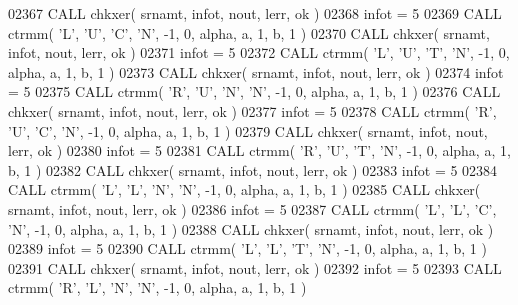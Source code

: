 \begin{DoxyCode}
02367       \textcolor{keyword}{CALL }chkxer( srnamt, infot, nout, lerr, ok )
02368       infot = 5
02369       \textcolor{keyword}{CALL }ctrmm( \textcolor{stringliteral}{'L'}, \textcolor{stringliteral}{'U'}, \textcolor{stringliteral}{'C'}, \textcolor{stringliteral}{'N'}, -1, 0, alpha, a, 1, b, 1 )
02370       \textcolor{keyword}{CALL }chkxer( srnamt, infot, nout, lerr, ok )
02371       infot = 5
02372       \textcolor{keyword}{CALL }ctrmm( \textcolor{stringliteral}{'L'}, \textcolor{stringliteral}{'U'}, \textcolor{stringliteral}{'T'}, \textcolor{stringliteral}{'N'}, -1, 0, alpha, a, 1, b, 1 )
02373       \textcolor{keyword}{CALL }chkxer( srnamt, infot, nout, lerr, ok )
02374       infot = 5
02375       \textcolor{keyword}{CALL }ctrmm( \textcolor{stringliteral}{'R'}, \textcolor{stringliteral}{'U'}, \textcolor{stringliteral}{'N'}, \textcolor{stringliteral}{'N'}, -1, 0, alpha, a, 1, b, 1 )
02376       \textcolor{keyword}{CALL }chkxer( srnamt, infot, nout, lerr, ok )
02377       infot = 5
02378       \textcolor{keyword}{CALL }ctrmm( \textcolor{stringliteral}{'R'}, \textcolor{stringliteral}{'U'}, \textcolor{stringliteral}{'C'}, \textcolor{stringliteral}{'N'}, -1, 0, alpha, a, 1, b, 1 )
02379       \textcolor{keyword}{CALL }chkxer( srnamt, infot, nout, lerr, ok )
02380       infot = 5
02381       \textcolor{keyword}{CALL }ctrmm( \textcolor{stringliteral}{'R'}, \textcolor{stringliteral}{'U'}, \textcolor{stringliteral}{'T'}, \textcolor{stringliteral}{'N'}, -1, 0, alpha, a, 1, b, 1 )
02382       \textcolor{keyword}{CALL }chkxer( srnamt, infot, nout, lerr, ok )
02383       infot = 5
02384       \textcolor{keyword}{CALL }ctrmm( \textcolor{stringliteral}{'L'}, \textcolor{stringliteral}{'L'}, \textcolor{stringliteral}{'N'}, \textcolor{stringliteral}{'N'}, -1, 0, alpha, a, 1, b, 1 )
02385       \textcolor{keyword}{CALL }chkxer( srnamt, infot, nout, lerr, ok )
02386       infot = 5
02387       \textcolor{keyword}{CALL }ctrmm( \textcolor{stringliteral}{'L'}, \textcolor{stringliteral}{'L'}, \textcolor{stringliteral}{'C'}, \textcolor{stringliteral}{'N'}, -1, 0, alpha, a, 1, b, 1 )
02388       \textcolor{keyword}{CALL }chkxer( srnamt, infot, nout, lerr, ok )
02389       infot = 5
02390       \textcolor{keyword}{CALL }ctrmm( \textcolor{stringliteral}{'L'}, \textcolor{stringliteral}{'L'}, \textcolor{stringliteral}{'T'}, \textcolor{stringliteral}{'N'}, -1, 0, alpha, a, 1, b, 1 )
02391       \textcolor{keyword}{CALL }chkxer( srnamt, infot, nout, lerr, ok )
02392       infot = 5
02393       \textcolor{keyword}{CALL }ctrmm( \textcolor{stringliteral}{'R'}, \textcolor{stringliteral}{'L'}, \textcolor{stringliteral}{'N'}, \textcolor{stringliteral}{'N'}, -1, 0, alpha, a, 1, b, 1 )

\end{DoxyCode}

